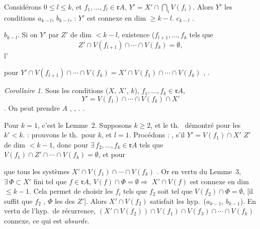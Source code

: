 \documentclass[11pt,a4paper]{article}
\begin{document}
Considérons \struck{\ill{} \ill{}} $0 \leq l \leq k$, et $f_1, \ldots, f_l \in \mathfrak{r}A$,  $Y' = X' \cap \bigcap_i V(f_i)$. Alors  $Y'$  les conditions $a_{k-l}$, $b_{k-l}$, \ill{} : $Y'$ est connexe en dim $\geq k-l$. \ill{} $c_{k-l}$ \ill{} \ill{} \ill{}. 

$b_{k-l}$. Si on   $Y'$ par $Z'$ de dim $< k-l$,  existence ($f_{l+1}, \ldots, f_k$ tels que
\[
  Z' \cap V(f_{l+1}) \cap \cdots \cap V(f_k) = \emptyset,
\]
l'\ill{} \ill{}

pour  $Y' \cap V(f_{l+1}) \cap \cdots \cap V(f_k) = X' \cap V(f_1) \cap \cdots \cap V(f_k)$  , \ill{} \ill{} \ill{} \ill{}.

\emph{Corollaire 1.} Sous les conditions \ill{} \ill{} \ill{} \ill{} \ill{} ($X$, $X'$, $k$),  \ill{} $f_1, \ldots, f_k \in \mathfrak{r}A$, \ill{}
\[
  Y' = V(f_1) \cap \cdots \cap V(f_k) \cap X'
\]
\ill{} \ill{}. On peut prendre  \ill{} \ill{} \ill{} \ill{} $A$ \ill{} \emph{\ill{}}, \ill{} \ill{} \ill{} \ill{}, \ill{}\ill{}.  \ill{} \ill{}.

Pour $k = 1$, c'est le Lemme~2. Supposons $k \geq 2$, et le th.\  démontré pour les $k' < k$. \ill{} \ill{} \ill{} : prouvons le th.\ pour $k$, et $l = 1$. Procédons \ill{} : \ill{}, s'il  \ill{} \ill{} $Y' = V(f_1) \cap X'$  \ill{}  \ill{} $Z'$ de dim $< k-1$, donc pour $\exists\, f_2, \ldots, f_k \in \mathfrak{r}A$ tels que $V(f_1) \cap Z' \cap \cdots \cap V(f_k) = \emptyset$, et pour

que tous les systèmes $X' \cap V(f_1) \cap \cdots \cap V(f_k)$  \emph{}. Or \struck{\ill{}} \ill{} \ill{} en vertu du Lemme~3, $\exists\, \Phi \subset X'$ fini tel que $f \in \mathfrak{r}A$, $V(f) \cap \Phi = \emptyset \Longrightarrow$ $X' \cap V(f)$ est connexe en dim $\leq k-1$.  Cela permet de choisir les $f_i$ tels que $f_2$ soit tel que $V(f_2) \cap \Phi = \emptyset$, \struck{\ill{}} [il suffit que $f_2$ \ill{}, \ill{} \ill{} \ill{} \ill{} $\Phi$ \ill{} les \ill{}  \struck{\ill{}} des $Z'$]. Alors $X' \cap V(f_2)$ satisfait les hyp.\ ($a_{k-1}$, $b_{k-1}$). En vertu de l'hyp.\ de récurrence, \ill{} \ill{} $(X' \cap V(f_2)) \cap V(f_1) \cap V(f_3) \cap \cdots \cap V(f_k)$  connexe, ce qui est \emph{absurde}.
\end{document}

